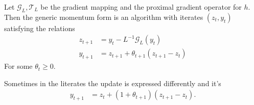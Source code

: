 \documentclass[12pt]{article}
\begin{document}
        \begin{definition}\label{def:generic_momentum}
            Let $\mathcal G_L, \mathcal T_L$ be the gradient mapping and the proximal gradient operator for $h$. 
            Then the generic momentum form is an algorithm with iterates $(z_t, y_t)$ satisfying the relations 
            \begin{align*}
                z_{t + 1} &= y_t - L^{-1}\mathcal G_L(y_t)
                \\
                y_{t + 1 } &= z_{t + 1} + \theta_{t + 1}(z_{t + 1} - z_t)
            \end{align*}
            For some $\theta_t \ge 0$. 
        \end{definition}
        \begin{remark}
            Sometimes in the literates the update is expressed differently and it's 
            \begin{align*}
                y_{t + 1} &= z_t + (1 + \theta_{t + 1})(z_{t + 1} - z_t). 
            \end{align*}
        \end{remark}
\end{document}
